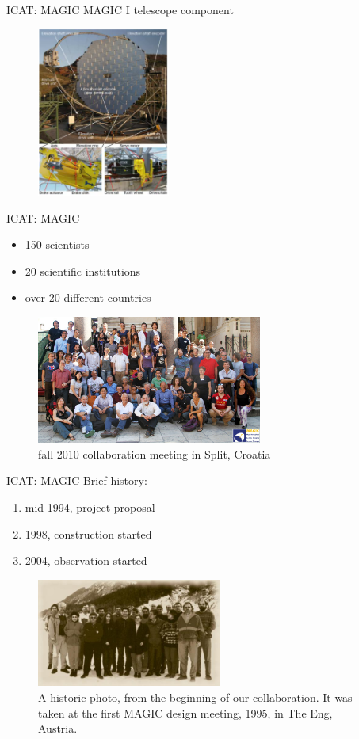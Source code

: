 \documentclass{beamer}
\begin{document}
\begin{frame}{ICAT: MAGIC}
    MAGIC I telescope component
    \begin{figure}[h]
        \includegraphics[width=165px]{MAGIC_I_component.png}
    \end{figure}
\end{frame}


\begin{frame}{ICAT: MAGIC}
	\begin{itemize}
		\item 150 scientists
		\item 20 scientific institutions
		\item over 20 different countries
    \end{itemize}
    \begin{figure}[h]
        \includegraphics[width=280px]{CollaborationPicture2010.jpg}
        \caption{fall 2010 collaboration meeting in Split, Croatia}
    \end{figure}
\end{frame}


\begin{frame}{ICAT: MAGIC}
	Brief history:
	\begin{enumerate}
        \item mid-1994, project proposal
        \item 1998, construction started
        \item 2004, observation started
    \end{enumerate}
    \begin{figure}[h]
        \includegraphics[width=230px]{magic-coll-old1.jpeg}
        \caption{A historic photo, from the beginning of our collaboration. It was taken at the first MAGIC design meeting, 1995, in The Eng, Austria.}
    \end{figure}
\end{frame}
\end{document}
